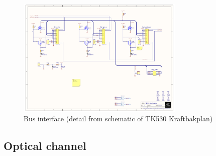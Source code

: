 \begin{figure}[h]
    \centering
    \includegraphics[trim={1cm 15cm 25.5cm 3cm},clip,width=8cm]{img/TK530_Kraftbakplan.pdf}
    \caption{Bus interface (detail from schematic of TK530 Kraftbakplan)}
    \label{fig:ki_bi}
\end{figure}

\subsection{Optical channel}
\label{optical}